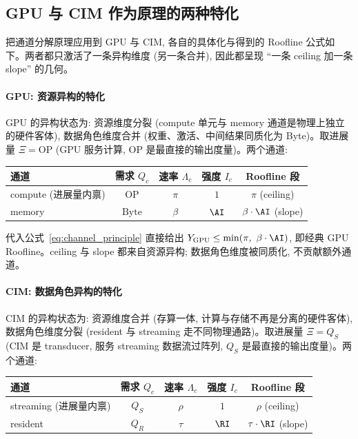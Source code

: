 \subsection{GPU 与 CIM 作为原理的两种特化}
\label{sec:gpu_cim_specialization}

把通道分解原理应用到 GPU 与 CIM, 各自的具体化与得到的 Roofline 公式如下。两者都只激活了一条异构维度 (另一条合并), 因此都呈现 “一条 ceiling 加一条 slope” 的几何。

\paragraph{GPU: 资源异构的特化}
GPU 的异构状态为: 资源维度分裂 (compute 单元与 memory 通道是物理上独立的硬件客体), 数据角色维度合并 (权重、激活、中间结果同质化为 Byte)。取进展量 $\Xi = \mathrm{OP}$ (GPU 服务计算, OP 是最直接的输出度量)。两个通道:

\begin{center}
\small
\renewcommand{\arraystretch}{1.2}
\begin{tabular}{@{} l c c c c @{}}
\toprule
\textbf{通道} & \textbf{需求 $Q_c$} & \textbf{速率 $\Lambda_c$} & \textbf{强度 $I_c$} & \textbf{Roofline 段} \\
\midrule
compute (进展量内禀) & $\mathrm{OP}$   & $\pi$   & $1$   & $\pi$ (ceiling) \\
memory               & $\mathrm{Byte}$ & $\beta$ & $\AI$ & $\beta \cdot \AI$ (slope) \\
\bottomrule
\end{tabular}
\end{center}

代入公式~\eqref{eq:channel_principle} 直接给出 $Y_{\mathrm{GPU}} \le \min(\pi,\ \beta \cdot \AI)$, 即经典 GPU Roofline。ceiling 与 slope 都来自资源异构; 数据角色维度被同质化, 不贡献额外通道。

\paragraph{CIM: 数据角色异构的特化}
CIM 的异构状态为: 资源维度合并 (存算一体, 计算与存储不再是分离的硬件客体), 数据角色维度分裂 (resident 与 streaming 走不同物理通路)。取进展量 $\Xi = Q_S$ (CIM 是 transducer, 服务 streaming 数据流过阵列, $Q_S$ 是最直接的输出度量)。两个通道:

\begin{center}
\small
\renewcommand{\arraystretch}{1.2}
\begin{tabular}{@{} l c c c c @{}}
\toprule
\textbf{通道} & \textbf{需求 $Q_c$} & \textbf{速率 $\Lambda_c$} & \textbf{强度 $I_c$} & \textbf{Roofline 段} \\
\midrule
streaming (进展量内禀) & $Q_S$ & $\rho$  & $1$   & $\rho$ (ceiling) \\
resident               & $Q_R$ & $\tau$  & $\RI$ & $\tau \cdot \RI$ (slope) \\
\bottomrule
\end{tabular}
\end{center}

